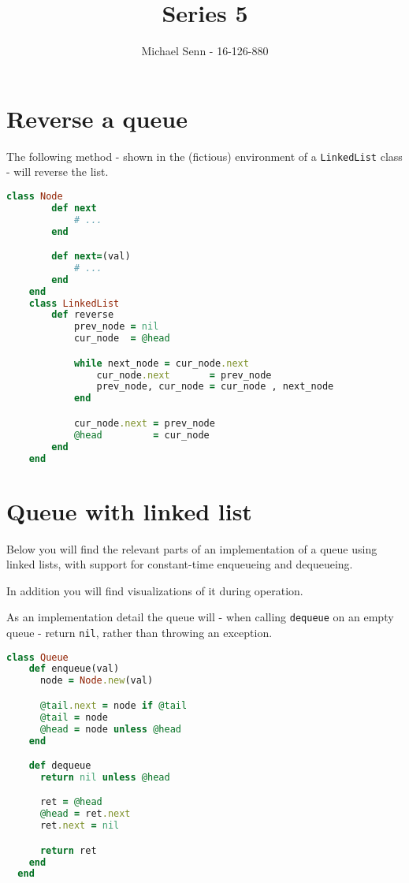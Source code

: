 \documentclass[a4paper]{scrartcl}
\title{Series 5}
\author{Michael Senn - 16-126-880}
\date{}
\begin{document}
\maketitle

\section{Reverse a queue}

The following method - shown in the (fictious) environment of a \texttt{LinkedList}
class - will reverse the list.

\begin{lstlisting}[language=ruby]
    class Node
        def next
            # ...
        end

        def next=(val)
            # ...
        end
    end
    class LinkedList
        def reverse
            prev_node = nil 
            cur_node  = @head

            while next_node = cur_node.next
                cur_node.next       = prev_node
                prev_node, cur_node = cur_node , next_node
            end 

            cur_node.next = prev_node
            @head         = cur_node
        end
    end
\end{lstlisting}



\section{Queue with linked list}

Below you will find the relevant parts of an implementation of a queue using
linked lists, with support for constant-time enqueueing and dequeueing.

In addition you will find visualizations of it during operation.

As an implementation detail the queue will - when calling \texttt{dequeue} on
an empty queue - return \texttt{nil}, rather than throwing an exception.

\begin{lstlisting}[language=ruby]
  class Queue
    def enqueue(val)
      node = Node.new(val)

      @tail.next = node if @tail
      @tail = node
      @head = node unless @head
    end

    def dequeue
      return nil unless @head

      ret = @head
      @head = ret.next
      ret.next = nil

      return ret
    end
  end
\end{lstlisting}
\end{document}
